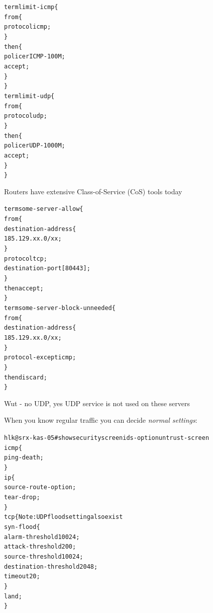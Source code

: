 \documentclass[Screen16to9,17pt]{foils}
\begin{document}

\begin{alltt}\footnotesize
term limit-icmp \{
    from \{
        protocol icmp;
    \}
    then \{
        policer ICMP-100M;
        accept;
    \}
\}
term limit-udp \{
    from \{
        protocol udp;
    \}
    then \{
        policer UDP-1000M;
        accept;
    \}
\}
\end{alltt}

Routers have extensive Class-of-Service (CoS) tools today


\begin{alltt}\footnotesize
term some-server-allow \{
    from \{
        destination-address \{
            185.129.xx.0/xx;
        \}
        protocol tcp;
        destination-port [ 80 443 ];
    \}
    then accept;
\}
term some-server-block-unneeded \{
    from \{
        destination-address \{
            185.129.xx.0/xx;
        \}
        protocol-except icmp;
    \}
    then discard;
\}
\end{alltt}

Wut - no UDP, yes UDP service is not used on these servers



When you know regular traffic you can decide \emph{normal settings}:

\begin{alltt}\footnotesize
hlk@srx-kas-05# show security screen ids-option untrust-screen
icmp \{
    ping-death;
\}
ip \{
    source-route-option;
    tear-drop;
\}
tcp \{    Note: UDP flood setting also exist
    syn-flood \{
        alarm-threshold 10024;
        attack-threshold 200;
        source-threshold 10024;
        destination-threshold 2048;
        timeout 20;
    \}
    land;
\}
\end{alltt}



\slidenext{}
\end{document}
